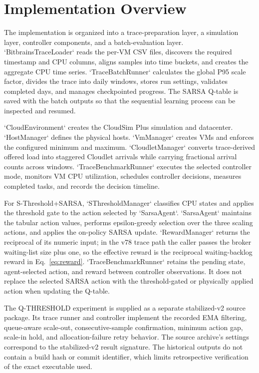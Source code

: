 \documentclass[pdflatex,sn-mathphys-num]{sn-jnl}
\begin{document}
\section{Implementation Overview}\label{sec:implementation}

The implementation is organized into a trace-preparation layer, a simulation layer, controller components, and a batch-evaluation layer. `BitbrainsTraceLoader` reads the per-VM CSV files, discovers the required timestamp and CPU columns, aligns samples into time buckets, and creates the aggregate CPU time series. `TraceBatchRunner` calculates the global P95 scale factor, divides the trace into daily windows, stores run settings, validates completed days, and manages checkpointed progress. The SARSA Q-table is saved with the batch outputs so that the sequential learning process can be inspected and resumed.

`CloudEnvironment` creates the CloudSim Plus simulation and datacenter. `HostManager` defines the physical hosts. `VmManager` creates VMs and enforces the configured minimum and maximum. `CloudletManager` converts trace-derived offered load into staggered Cloudlet arrivals while carrying fractional arrival counts across windows. `TraceBenchmarkRunner` executes the selected controller mode, monitors VM CPU utilization, schedules controller decisions, measures completed tasks, and records the decision timeline.

For S-Threshold+SARSA, `SThresholdManager` classifies CPU states and applies the threshold gate to the action selected by `SarsaAgent`. `SarsaAgent` maintains the tabular action values, performs epsilon-greedy selection over the three scaling actions, and applies the on-policy SARSA update. `RewardManager` returns the reciprocal of its numeric input; in the v78 trace path the caller passes the broker waiting-list size plus one, so the effective reward is the reciprocal waiting-backlog reward in Eq.~\ref{eq:reward}. `TraceBenchmarkRunner` retains the pending state, agent-selected action, and reward between controller observations. It does not replace the selected SARSA action with the threshold-gated or physically applied action when updating the Q-table.

The Q-THRESHOLD experiment is supplied as a separate stabilized-v2 source package. Its trace runner and controller implement the recorded EMA filtering, queue-aware scale-out, consecutive-sample confirmation, minimum action gap, scale-in hold, and allocation-failure retry behavior. The source archive's settings correspond to the stabilized-v2 result signature. The historical outputs do not contain a build hash or commit identifier, which limits retrospective verification of the exact executable used.
\end{document}
